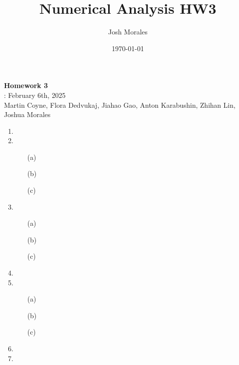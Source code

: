 \documentclass[12pt]{article}
\title{Numerical Analysis HW3}
\author{Josh Morales}
\date{\today}
\begin{document}
\pagestyle{fancy}
\begin{center}
\textbf{\Large Homework 3} \\
: February 6th, 2025\\
Martin Coyne, Flora Dedvukaj, Jiahao Gao, Anton Karabushin, Zhihan Lin, Joshua Morales
\end{center}
\begin{enumerate}[leftmargin=2em]
    \item

    \item 
    \begin{enumerate}
        \item[(a)]
        
        \item[(b)]
        
        \item[(c)]  
    \end{enumerate}


    \item
    \begin{enumerate}
        \item[(a)] 
        
        \item[(b)]
        
        \item[(c)]
    \end{enumerate}
    
    \item 

    \item
    \begin{enumerate}
        \item[(a)]

        \item[(b)]
        
        \item[(c)]
    \end{enumerate}

    \item

    \item
\end{enumerate}
\end{document}
